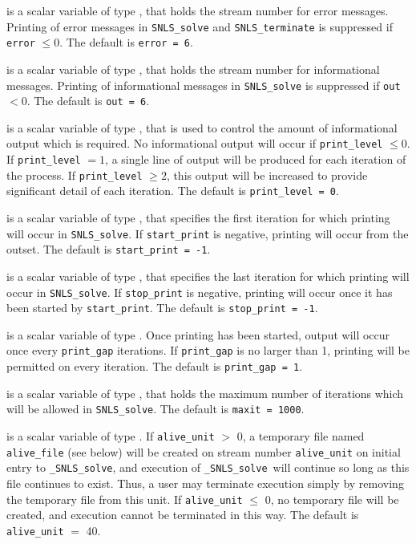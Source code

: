 \documentclass{galahad}
\newcommand{\packagename}{SNLS}
\newcommand{\fullpackagename}{\libraryname\_\packagename}
\newcommand{\solver}{{\tt \fullpackagename\_solve}}
\begin{document}
\begin{description}

 is a scalar variable of type \integer, that holds the
stream number for error messages. Printing of error messages in
{\tt \packagename\_solve} and {\tt \packagename\_terminate}
is suppressed if {\tt error} $\leq 0$.
The default is {\tt error = 6}.

 is a scalar variable of type \integer, that holds the
stream number for informational messages. Printing of informational messages in
{\tt \packagename\_solve} is suppressed if {\tt out} $< 0$.
The default is {\tt out = 6}.

 is a scalar variable of type \integer, that is used
to control the amount of informational output which is required. No
informational output will occur if {\tt print\_level} $\leq 0$. If
{\tt print\_level} $= 1$, a single line of output will be produced for each
iteration of the process. If {\tt print\_level} $\geq 2$, this output will be
increased to provide significant detail of each iteration.
The default is {\tt print\_level = 0}.

 is a scalar variable of type \integer, that specifies
the first iteration for which printing will occur in {\tt \packagename\_solve}.
If {\tt start\_print} is negative, printing will occur from the outset.
The default is {\tt start\_print = -1}.

 is a scalar variable of type \integer, that specifies
the last iteration for which printing will occur in  {\tt \packagename\_solve}.
If {\tt stop\_print} is negative, printing will occur once it has been
started by {\tt start\_print}.
The default is {\tt stop\_print = -1}.

 is a scalar variable of type \integer.
Once printing has been started, output will occur once every
{\tt print\_gap} iterations. If {\tt print\_gap} is no larger than 1,
printing will be permitted on every iteration.
The default is {\tt print\_gap = 1}.

 is a scalar variable of type \integer, that holds the
maximum number of iterations which will be allowed in {\tt \packagename\_solve}.
The default is {\tt maxit = 1000}.

 is a scalar variable of type \integer.
If {\tt alive\_unit} $>$ 0, a temporary file named {\tt alive\_file} (see below)
will be created on stream number {\tt alive\_unit} on initial entry to
\solver, and execution of \solver\ will continue so
long as this file continues to exist. Thus, a user may terminate execution
simply by removing the temporary file from this unit.
If {\tt alive\_unit} $\leq$ 0, no temporary file will be created, and
execution cannot be terminated in this way.
The default is {\tt alive\_unit} $=$ 40.


\end{description}
\end{document}
